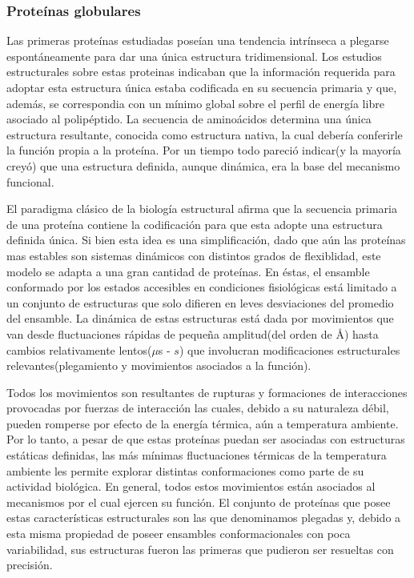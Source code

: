 \subsubsection{Proteínas globulares}

Las primeras proteínas estudiadas poseían una tendencia intrínseca a plegarse espontáneamente para dar una única estructura tridimensional.
Los estudios estructurales sobre estas proteinas indicaban que la información requerida para adoptar esta estructura única estaba codificada en su secuencia primaria y que, además, se correspondia con un mínimo global sobre el
perfil de energía libre asociado al polipéptido.  
La secuencia de aminoácidos determina una única estructura resultante, conocida como estructura nativa, la cual debería conferirle la función propia a la proteína.
Por un tiempo todo pareció indicar(y la mayoría creyó) que una estructura definida, aunque dinámica, era la base del mecanismo funcional.

El paradigma clásico de la biología estructural afirma que la secuencia primaria de una proteína contiene la codificación para que esta adopte una estructura definida única.
Si bien esta idea es una simplificación, dado que aún las proteínas mas estables son sistemas dinámicos con distintos grados de flexiblidad, este modelo se adapta a una gran cantidad de proteínas.
En éstas, el ensamble conformado por los estados accesibles en condiciones fisiológicas está limitado a un conjunto de estructuras que solo difieren en leves desviaciones del promedio del ensamble.
La dinámica de estas estructuras está dada por movimientos que van desde fluctuaciones rápidas de pequeña amplitud(del orden de \AA) hasta cambios relativamente lentos($\mu$s - $s$) que 
involucran modificaciones estructurales relevantes(plegamiento y movimientos asociados a la función).

Todos los movimientos son resultantes de rupturas y formaciones de interacciones provocadas por fuerzas de interacción las cuales, debido a su naturaleza débil, pueden romperse por efecto de la energía térmica, aún a temperatura ambiente.
Por lo tanto, a pesar de que estas proteínas puedan ser asociadas con estructuras estáticas definidas, las más mínimas fluctuaciones térmicas de la temperatura ambiente les permite explorar distintas conformaciones como parte de su actividad biológica.
En general, todos estos movimientos están asociados al mecanismos por el cual ejercen su función.
El conjunto de proteínas que posee estas características estructurales son las que denominamos plegadas y, debido a esta misma propiedad de poseer ensambles conformacionales con poca variabilidad, sus estructuras fueron las primeras que pudieron ser resueltas con precisión. 



